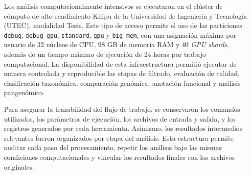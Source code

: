 Los análisis computacionalmente intensivos se ejecutaron en el clúster de cómputo de alto rendimiento Khipu de la Universidad de Ingeniería y Tecnología (UTEC), modalidad Tesis. Este tipo de acceso permite el uso de las particiones \texttt{debug}, \texttt{debug-gpu}, \texttt{standard}, \texttt{gpu} y \texttt{big-mem}, con una asignación máxima por usuario de 32 núcleos de CPU, 98 GB de memoria RAM y 40 \textit{GPU shards}, además de un tiempo máximo de ejecución de 24 horas por trabajo computacional. La disponibilidad de esta infraestructura permitió ejecutar de manera controlada y reproducible las etapas de filtrado, evaluación de calidad, clasificación taxonómica, comparación genómica, anotación funcional y análisis pangenómico.

Para asegurar la trazabilidad del flujo de trabajo, se conservaron los comandos utilizados, los parámetros de ejecución, los archivos de entrada y salida, y los registros generados por cada herramienta. Asimismo, los resultados intermedios relevantes fueron organizados por etapa del análisis. Esta estructura permite auditar cada paso del procesamiento, repetir los análisis bajo las mismas condiciones computacionales y vincular los resultados finales con los archivos originales.


